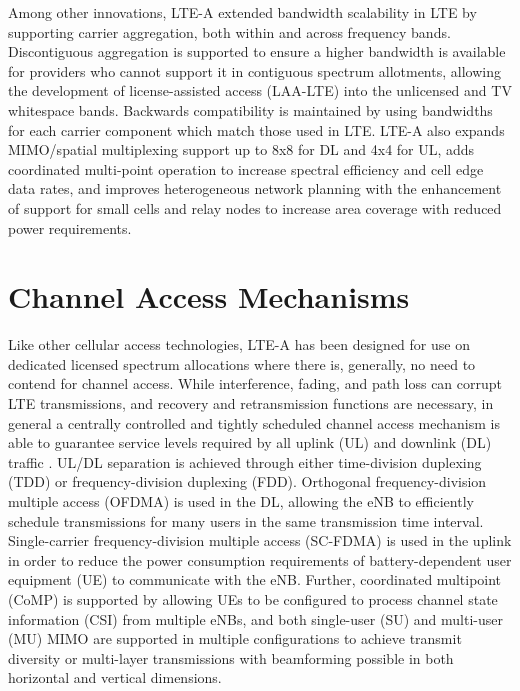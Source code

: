 Among other innovations, \mbox{LTE-A} extended bandwidth scalability in LTE by supporting carrier aggregation, both within and across frequency bands.   Discontiguous aggregation is supported to ensure a higher bandwidth is available for providers who cannot support it in contiguous spectrum allotments, allowing the development of license-assisted access (\mbox{LAA-LTE}) into the unlicensed and TV whitespace bands.  Backwards compatibility is maintained by using bandwidths for each carrier component which match those used in LTE.  \mbox{LTE-A} also expands MIMO/spatial multiplexing support up to 8x8 for DL and 4x4 for UL, adds coordinated multi-point operation to increase spectral efficiency and cell edge data rates, and improves heterogeneous network planning with the enhancement of support for small cells and relay nodes to increase area coverage with reduced power requirements.

\section{Channel Access Mechanisms}
\label{channel-access}
Like other cellular access technologies, \mbox{LTE-A} has been designed for use on dedicated licensed spectrum allocations where there is, generally, no need to contend for channel access.  While interference, fading, and path loss can corrupt LTE transmissions, and recovery and retransmission functions are necessary, in general a centrally controlled and tightly scheduled channel access mechanism is able to guarantee service levels required by all uplink (UL) and downlink (DL) traffic \cite{tr36300}. UL/DL separation is achieved through either time-division duplexing (TDD) or frequency-division duplexing (FDD).  Orthogonal frequency-division multiple access (OFDMA) is used in the DL, allowing the eNB to efficiently schedule transmissions for many users in the same transmission time interval.  Single-carrier frequency-division multiple access (SC-FDMA) is used in the uplink in order to reduce the power consumption requirements of battery-dependent user equipment (UE) to communicate with the eNB.  Further, coordinated multipoint (CoMP) is supported by allowing UEs to be configured to process channel state information (CSI) from multiple eNBs, and both single-user (SU) and multi-user (MU) MIMO are supported in multiple configurations to achieve transmit diversity or multi-layer transmissions with beamforming possible in both horizontal and vertical dimensions.


